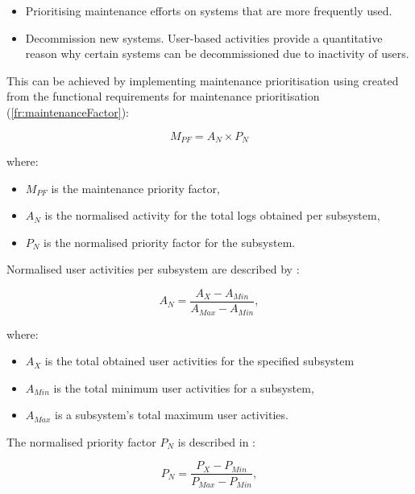 \begin{itemize}
	\item Prioritising maintenance efforts on systems that are more frequently used.
	\item Decommission new systems. User-based activities provide a quantitative reason why certain systems can be decommissioned due to inactivity of users.
\end{itemize}

This can be achieved by implementing maintenance prioritisation using  created from the functional requirements for maintenance prioritisation (\ref{fr:maintenanceFactor}):

\begin{equation}
	\label{eq:ch2_maintenanceFactorSimplified}
	M_{PF} = A_{N} \times P_{N}
\end{equation}

where:

\begin{itemize}
	\item $M_{PF}$ is the maintenance priority factor,
	\item $A_{N}$ is the normalised activity for the total logs obtained per subsystem,
	\item $P_{N}$ is the normalised priority factor for the subsystem.
\end{itemize}

Normalised user activities per subsystem are described by :

\begin{equation}
	\label{eq:ch2_eventNormalised}
	A_{N} = \frac{A_X - A_{Min}}{A_{Max} - A_{Min}},
\end{equation}

where:

\begin{itemize}
	\item $A_X$ is the total obtained user activities for the specified subsystem
	\item $A_{Min}$ is the total minimum user activities for a subsystem,
	\item $A_{Max}$ is a subsystem's total maximum user activities.
\end{itemize}

The normalised priority factor $P_N$ is described in :

\begin{equation}
	\label{eq:ch2_priorityNormalised}
	P_{N} = \frac{P_X - P_{Min}}{P_{Max} - P_{Min}},
\end{equation}

